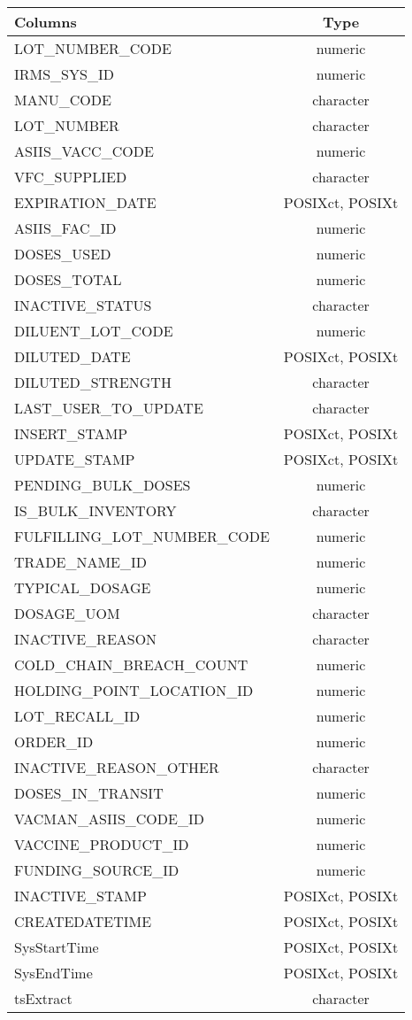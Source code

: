 \documentclass[
  letterpaper,
  DIV=11,
  numbers=noendperiod]{scrreprt}
\begin{document}
\begin{longtable}{lc}
\toprule
Columns & Type \\ 
\midrule
LOT\_NUMBER\_CODE & numeric \\ 
IRMS\_SYS\_ID & numeric \\ 
MANU\_CODE & character \\ 
LOT\_NUMBER & character \\ 
ASIIS\_VACC\_CODE & numeric \\ 
VFC\_SUPPLIED & character \\ 
EXPIRATION\_DATE & POSIXct, POSIXt \\ 
ASIIS\_FAC\_ID & numeric \\ 
DOSES\_USED & numeric \\ 
DOSES\_TOTAL & numeric \\ 
INACTIVE\_STATUS & character \\ 
DILUENT\_LOT\_CODE & numeric \\ 
DILUTED\_DATE & POSIXct, POSIXt \\ 
DILUTED\_STRENGTH & character \\ 
LAST\_USER\_TO\_UPDATE & character \\ 
INSERT\_STAMP & POSIXct, POSIXt \\ 
UPDATE\_STAMP & POSIXct, POSIXt \\ 
PENDING\_BULK\_DOSES & numeric \\ 
IS\_BULK\_INVENTORY & character \\ 
FULFILLING\_LOT\_NUMBER\_CODE & numeric \\ 
TRADE\_NAME\_ID & numeric \\ 
TYPICAL\_DOSAGE & numeric \\ 
DOSAGE\_UOM & character \\ 
INACTIVE\_REASON & character \\ 
COLD\_CHAIN\_BREACH\_COUNT & numeric \\ 
HOLDING\_POINT\_LOCATION\_ID & numeric \\ 
LOT\_RECALL\_ID & numeric \\ 
ORDER\_ID & numeric \\ 
INACTIVE\_REASON\_OTHER & character \\ 
DOSES\_IN\_TRANSIT & numeric \\ 
VACMAN\_ASIIS\_CODE\_ID & numeric \\ 
VACCINE\_PRODUCT\_ID & numeric \\ 
FUNDING\_SOURCE\_ID & numeric \\ 
INACTIVE\_STAMP & POSIXct, POSIXt \\ 
CREATEDATETIME & POSIXct, POSIXt \\ 
SysStartTime & POSIXct, POSIXt \\ 
SysEndTime & POSIXct, POSIXt \\ 
tsExtract & character \\ 
\bottomrule
\end{longtable}
\end{document}
